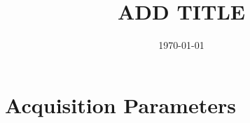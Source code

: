 \documentclass{article}
\title{ADD TITLE}
\date{\today}
\begin{document}
\section{Acquisition Parameters}
\end{document}
